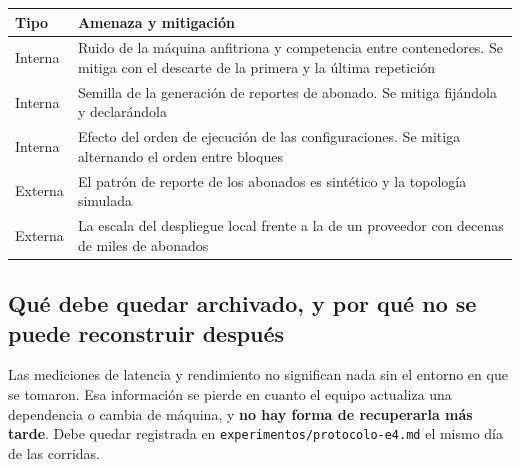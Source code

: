 \documentclass[11pt,a4paper]{article}
\begin{document}
\begin{center}
	\small
	\begin{tabular}{@{}p{2.0cm}p{12.9cm}@{}}
		\toprule
		\textbf{Tipo} & \textbf{Amenaza y mitigación} \\
		\midrule
		Interna & Ruido de la máquina anfitriona y competencia entre contenedores. Se mitiga con el descarte de la primera y la última repetición \\
		Interna & Semilla de la generación de reportes de abonado. Se mitiga fijándola y declarándola \\
		Interna & Efecto del orden de ejecución de las configuraciones. Se mitiga alternando el orden entre bloques \\
		\addlinespace
		Externa & El patrón de reporte de los abonados es sintético y la topología simulada \\
		Externa & La escala del despliegue local frente a la de un proveedor con decenas de miles de abonados \\
		\bottomrule
	\end{tabular}
\end{center}

\subsection{Qué debe quedar archivado, y por qué no se puede reconstruir después}

Las mediciones de latencia y rendimiento no significan nada sin el entorno en que se tomaron. Esa información se pierde en cuanto el equipo actualiza una dependencia o cambia de máquina, y \textbf{no hay forma de recuperarla más tarde}. Debe quedar registrada en \texttt{experimentos/protocolo-e4.md} el mismo día de las corridas.
\end{document}
